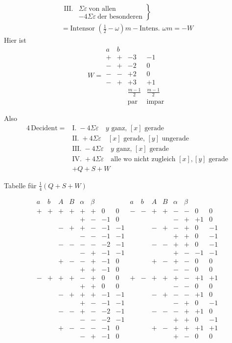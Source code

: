 %
\[
\begin{gathered}
\left.\begin{array}{rl}
\mathrm{III.}&\Sigma\varepsilon\ \text{von allen}\\
&-4\Sigma\varepsilon\ \text{der besonderen}
\end{array}\right\}\\
={}\text{Intensor }(\tfrac12-\omega)m-\text{Intens. }\omega m=-W
\end{gathered}
\]
Hier ist
\[
W=\begin{array}{cc|rr}
a&b&&\\
+&+&-3&-1\\
-&+&-2&0\\
-&-&+2&0\\
-&+&+3&+1\\[3pt]
&&\frac{m-1}{2}&\frac{m-1}{2}\\
&&\text{par}&\text{impar}
\end{array}
\]

Also
\[
\begin{aligned}
4\,\text{Decident}={}&\text{I.}\;-4\Sigma\varepsilon\quad y\text{ ganz, }[x]\text{ gerade}\\
&\text{II.}\;+4\Sigma\varepsilon\quad[x]\text{ gerade, }[y]\text{ ungerade}\\
&\text{III.}\;-4\Sigma\varepsilon\quad y\text{ ganz, }[x]\text{ gerade}\\
&\text{IV.}\;+4\Sigma\varepsilon\quad\text{alle wo nicht zugleich }[x],[y]\text{ gerade}\\
&+Q+S+W
\end{aligned}
\]

\begin{center}Tabelle für $\frac14(Q+S+W)$\end{center}
\begingroup\small\setlength{\arraycolsep}{2pt}
\[
\begin{array}{cccccc|rr||cccccc|rr}
a&b&A&B&\alpha&\beta&&&a&b&A&B&\alpha&\beta&&\\
+&+&+&+&+&+&0&0&-&-&+&+&-&-&0&0\\
&&&&+&-&-1&0&&&&&-&+&+1&0\\
&&-&+&+&-&-1&-1&&&-&+&-&+&0&-1\\
&&&&-&-&-1&-1&&&&&+&+&0&-1\\
&&-&-&-&-&-2&-1&&&-&-&+&+&0&-1\\
&&&&-&+&-1&-1&&&&&+&-&-1&-1\\
&&+&-&-&+&-1&0&&&+&-&+&-&0&0\\
&&&&+&+&-1&0&&&&&-&-&0&0\\[3pt]
-&+&+&+&-&+&0&0&+&-&+&+&+&-&+1&+1\\
&&&&+&+&0&0&&&&&-&-&0&0\\
&&-&+&+&+&-1&-1&&&-&+&-&-&+1&0\\
&&&&+&-&-1&-1&&&&&-&+&0&-1\\
&&-&-&+&-&-2&-1&&&-&-&-&+&+1&0\\
&&&&-&-&-2&-1&&&&&+&+&0&-1\\
&&+&-&-&-&-1&0&&&+&-&+&+&+1&+1\\
&&&&-&+&-1&0&&&&&+&-&0&0\\
\end{array}
\]
\endgroup

